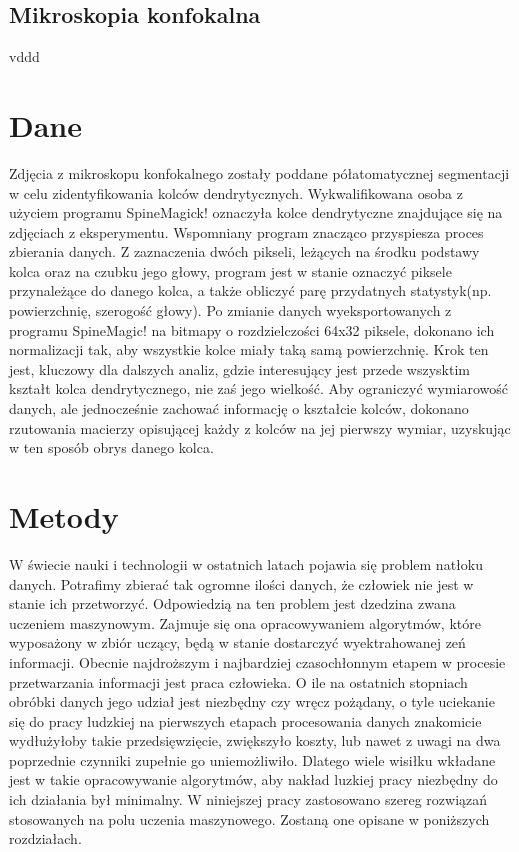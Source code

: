 \documentclass{article}
\begin{document}
\subsection{Mikroskopia konfokalna}
vddd

\section{Dane}

Zdjęcia z mikroskopu konfokalnego zostały poddane półatomatycznej segmentacji w celu zidentyfikowania kolców dendrytycznych. 
Wykwalifikowana osoba z użyciem programu SpineMagick! oznaczyła kolce dendrytyczne znajdujące się na zdjęciach z eksperymentu.
Wspomniany program znacząco przyspiesza proces zbierania danych.
Z zaznaczenia dwóch pikseli, leżących na środku podstawy kolca oraz na czubku jego głowy, program jest w stanie oznaczyć piksele przynależące do danego kolca, a także obliczyć parę przydatnych statystyk(np. powierzchnię, szerogość głowy).
Po zmianie danych wyeksportowanych z programu SpineMagic! na bitmapy o rozdzielczości 64x32 piksele, dokonano ich normalizacji tak, aby wszystkie kolce miały taką samą powierzchnię.
Krok ten jest, kluczowy dla dalszych analiz, gdzie interesujący jest przede wszysktim kształt kolca dendrytycznego, nie zaś jego wielkość.
Aby ograniczyć wymiarowość danych, ale jednocześnie zachować informację o kształcie kolców, dokonano rzutowania macierzy opisującej każdy z kolców na jej pierwszy wymiar, uzyskując w ten sposób obrys danego kolca.


\section{Metody}
W świecie nauki i technologii w ostatnich latach pojawia się problem natłoku danych.
Potrafimy zbierać tak ogromne ilości danych, że człowiek nie jest w stanie ich przetworzyć.
Odpowiedzią na ten problem jest dzedzina zwana uczeniem maszynowym. 
Zajmuje się ona opracowywaniem algorytmów, które wyposażony w zbiór uczący, będą w stanie dostarczyć wyektrahowanej zeń informacji.
Obecnie najdroższym i najbardziej czasochłonnym etapem w procesie przetwarzania informacji jest praca człowieka.
O ile na ostatnich stopniach obróbki danych jego udział jest niezbędny czy wręcz pożądany, o tyle uciekanie się do pracy ludzkiej na pierwszych etapach procesowania danych znakomicie wydłużyłoby takie przedsięwzięcie, zwiększyło koszty, lub nawet z uwagi na dwa poprzednie czynniki zupełnie go uniemożliwiło.
Dlatego wiele wisiłku wkładane jest w takie opracowywanie algorytmów, aby nakład luzkiej pracy niezbędny do ich działania był minimalny.
W niniejszej pracy zastosowano szereg rozwiązań stosowanych na polu uczenia maszynowego.
Zostaną one opisane w poniższych rozdziałach.
\end{document}
